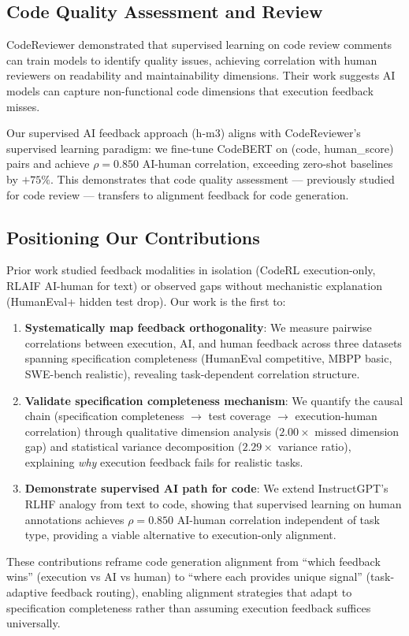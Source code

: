 \subsection{Code Quality Assessment and Review}

CodeReviewer \cite{li2022codereview} demonstrated that supervised learning on code review comments can train models to identify quality issues, achieving correlation with human reviewers on readability and maintainability dimensions. Their work suggests AI models can capture non-functional code dimensions that execution feedback misses.

Our supervised AI feedback approach (h-m3) aligns with CodeReviewer's supervised learning paradigm: we fine-tune CodeBERT on (code, human\_score) pairs and achieve $\rho=0.850$ AI-human correlation, exceeding zero-shot baselines by $+75\%$. This demonstrates that code quality assessment --- previously studied for code review --- transfers to alignment feedback for code generation.

\subsection{Positioning Our Contributions}

Prior work studied feedback modalities in isolation (CodeRL execution-only, RLAIF AI-human for text) or observed gaps without mechanistic explanation (HumanEval+ hidden test drop). Our work is the first to:

\begin{enumerate}
\item \textbf{Systematically map feedback orthogonality}: We measure pairwise correlations between execution, AI, and human feedback across three datasets spanning specification completeness (HumanEval competitive, MBPP basic, SWE-bench realistic), revealing task-dependent correlation structure.

\item \textbf{Validate specification completeness mechanism}: We quantify the causal chain (specification completeness $\rightarrow$ test coverage $\rightarrow$ execution-human correlation) through qualitative dimension analysis ($2.00\times$ missed dimension gap) and statistical variance decomposition ($2.29\times$ variance ratio), explaining \emph{why} execution feedback fails for realistic tasks.

\item \textbf{Demonstrate supervised AI path for code}: We extend InstructGPT's RLHF analogy from text to code, showing that supervised learning on human annotations achieves $\rho=0.850$ AI-human correlation independent of task type, providing a viable alternative to execution-only alignment.
\end{enumerate}

These contributions reframe code generation alignment from ``which feedback wins'' (execution vs AI vs human) to ``where each provides unique signal'' (task-adaptive feedback routing), enabling alignment strategies that adapt to specification completeness rather than assuming execution feedback suffices universally.
